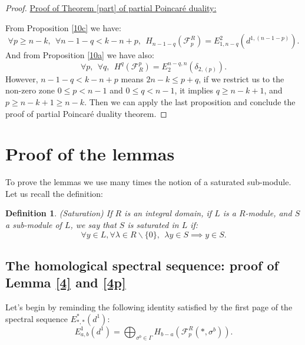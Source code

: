 \documentclass{article}
\newtheorem{definition}{Definition}
\begin{document}
\begin{proof}
    \underline{Proof of Theorem \ref{part} of partial Poincaré duality:}
    
    From Proposition \ref{10c} we have:
    \begin{equation*}
        \forall p\geq n-k,~~ \forall n-1-q<k-n+p,~~H_{n-1-q}(\mathcal{F}_p^R)=E^2_{1,n-q}(d^{1,(n-1-p)}).
    \end{equation*}
    And from Proposition \ref{10a} we have also:
    \begin{equation*}
        \forall p, ~~ \forall q,~~H^q(\mathcal{F}^p_R) = E^{n-q,n}_2(\delta_{2,(p)}).
    \end{equation*}
    However, $n-1-q < k-n+p$ means $2n-k\leq p+q$, if we restrict us to the non-zero zone $0\leq p <n-1$ and $0\leq q < n-1$, it implies $q \geq n-k+1$, and $p\geq n-k+1 \geq n-k$. Then we can apply the last proposition and conclude the proof of partial Poincaré duality theorem.
\end{proof}

\section{Proof of the lemmas}

To prove the lemmas we use many times the notion of a saturated sub-module. Let us recall the definition:

\begin{definition}
    (Saturation) If $R$ is an integral domain, if $L$ is a $R$-module, and $S$ a sub-module of $L$, we say that $S$ is saturated in $L$ if:
    \begin{equation*}
        \forall y\in L, \forall \lambda\in R \backslash\{0\},~~\lambda y \in S \implies y \in S.
    \end{equation*}
    \label{sat}
\end{definition}

\subsection{The homological spectral sequence: proof of Lemma \ref{4} and \ref{4p}}

Let's begin by reminding the following identity satisfied by the first page of the spectral sequence $E^*_{*,*}(d^{1})$:
\begin{equation*}
    E^1_{a,b}(d^{1})= \bigoplus_{\sigma^b \in \Gamma} H_{b-a}(\mathcal{F}_p^R(*,\sigma^b)).
\end{equation*}
\end{document}
